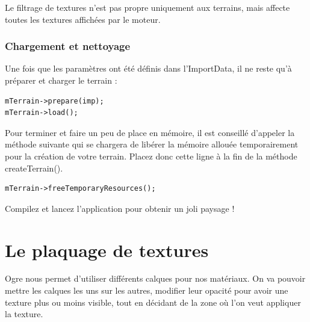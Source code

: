 Le filtrage de textures n'est pas propre uniquement aux terrains, mais affecte toutes les textures affichées par le moteur.


\subsubsection{Chargement et nettoyage}


Une fois que les paramètres ont été définis dans l'ImportData, il ne reste qu'à préparer et charger le terrain :

\begin{lstlisting}[caption={Préparation et chargement du terrain}]
mTerrain->prepare(imp);
mTerrain->load();
\end{lstlisting}

Pour terminer et faire un peu de place en mémoire, il est conseillé d'appeler la méthode suivante qui se chargera de libérer la mémoire allouée temporairement pour la création de votre terrain. Placez donc cette ligne à la fin de la méthode createTerrain().

\begin{lstlisting}[caption={Libération de place en mémoire}]
mTerrain->freeTemporaryResources();
\end{lstlisting}

Compilez et lancez l'application pour obtenir un joli paysage !


































\section{Le plaquage de textures}


Ogre nous permet d'utiliser différents calques pour nos matériaux. On va pouvoir mettre les calques les uns sur les autres, modifier leur opacité pour avoir une texture plus ou moins visible, tout en décidant de la zone o\`u l'on veut appliquer la texture.

